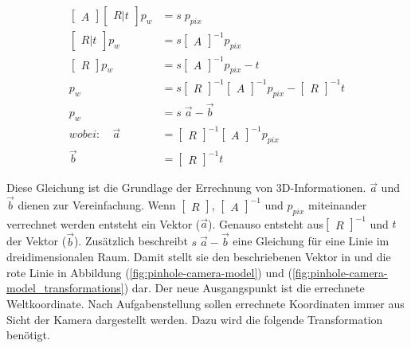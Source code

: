 	\begin{equation}
	\begin{aligned}
	\begin{bmatrix} A \end{bmatrix} \begin{bmatrix} R|t \end{bmatrix} p_w &= s \; p_{pix} \\
	\begin{bmatrix} R|t \end{bmatrix} p_w &= s \begin{bmatrix} A \end{bmatrix}^{-1} p_{pix} \\
	\begin{bmatrix} R \end{bmatrix} p_w &= s \begin{bmatrix} A \end{bmatrix}^{-1} p_{pix} - t \\
	p_w &= s \begin{bmatrix} R \end{bmatrix}^{-1} \begin{bmatrix} A \end{bmatrix}^{-1} p_{pix} - \begin{bmatrix} R \end{bmatrix}^{-1} t \\
	p_w &= s \; \vec{a} - \vec{b} \\
	wobei: \quad \vec{a} & = \begin{bmatrix} R \end{bmatrix}^{-1} \begin{bmatrix} A \end{bmatrix}^{-1} p_{pix} \\
	\vec{b} &= \begin{bmatrix} R \end{bmatrix}^{-1} t
	\end{aligned}
	\label{eq:pixel_zu_welt}
	\end{equation}
	
	Diese Gleichung ist die Grundlage der Errechnung von 3D-Informationen. \( \vec{a} \) und \( \vec{b} \) dienen zur Vereinfachung. Wenn \( \begin{bmatrix} R \end{bmatrix} \), \( \begin{bmatrix} A \end{bmatrix}^{-1} \) und \( p_{pix} \) miteinander verrechnet werden entsteht ein Vektor (\( \vec{a} \)). Genauso entsteht aus\( \begin{bmatrix} R \end{bmatrix}^{-1} \) und \( t \) der Vektor (\( \vec{b} \)). Zusätzlich beschreibt \( s \; \vec{a} - \vec{b} \) eine Gleichung für eine Linie im dreidimensionalen Raum. Damit stellt sie den beschriebenen Vektor in \citep[S. 3]{dawson-howe_simple_1994} und die rote Linie in Abbildung (\ref{fig:pinhole-camera-model}) und (\ref{fig:pinhole-camera-model_transformations}) dar. \newline
	Der neue Ausgangspunkt ist die errechnete Weltkoordinate. Nach Aufgabenstellung sollen errechnete Koordinaten immer aus Sicht der Kamera dargestellt werden. Dazu wird die folgende Transformation benötigt. 
	
